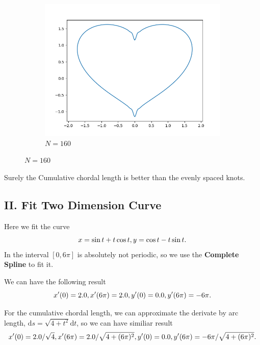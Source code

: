 \documentclass[a4paper]{article}
\begin{document}
\begin{figure}[H]
\begin{subfigure}[b]{0.35\textwidth}
        \centering
        \includegraphics[width=\textwidth]{../figure/E_heart_PP160.png}
        \caption{$N = 160$}
    \end{subfigure}
\end{figure}

Surely the Cumulative chordal length is better than the evenly spaced knots.




\subsection{II. Fit Two Dimension Curve}
Here we fit the curve 
\begin{equation}
    x = \sin t + t \cos t, \\
    y = \cos t - t \sin t.
\end{equation}
In the interval $[0, 6\pi]$ is absolutely not periodic, so we use the \textbf{Complete Spline} to fit it. 

We can have the following result 
\begin{equation}
    x^{\prime}(0) = 2.0, x^{\prime}(6 \pi) = 2.0, \\
    y^{\prime}(0) = 0.0, y^{\prime}(6 \pi) = -6 \pi. 
\end{equation}

For the cumulative chordal length, we can approximate the derivate by arc length, 
$\mathrm{d} s = \sqrt{4+t^2} \mathrm{d} t$, so we can have similiar result 
\begin{equation}
    x^{\prime}(0) = 2.0 / \sqrt{4}, x^{\prime}(6 \pi) = 2.0 / \sqrt{4 + (6 \pi)^2}, \\
    y^{\prime}(0) = 0.0, y^{\prime}(6 \pi) = -6 \pi / \sqrt{4 + (6 \pi)^2}.
\end{equation}
\end{document}

